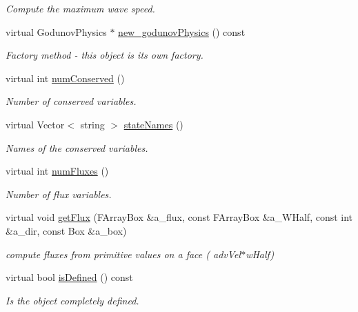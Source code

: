\begin{DoxyCompactItemize}
\begin{DoxyCompactList}\small\item\em Compute the maximum wave speed. \end{DoxyCompactList}\item 
virtual Godunov\-Physics $\ast$ \hyperlink{class_advection_physics_abbf17dd7a6726453af2e94d9ce1b5686}{new\-\_\-godunov\-Physics} () const 
\begin{DoxyCompactList}\small\item\em Factory method -\/ this object is its own factory. \end{DoxyCompactList}\item 
virtual int \hyperlink{class_advection_physics_ab139a3b1201a76e97e918381c5b3ff98}{num\-Conserved} ()
\begin{DoxyCompactList}\small\item\em Number of conserved variables. \end{DoxyCompactList}\item 
virtual Vector$<$ string $>$ \hyperlink{class_advection_physics_a992f0d9ca9515de44b82981c14a2fb31}{state\-Names} ()
\begin{DoxyCompactList}\small\item\em Names of the conserved variables. \end{DoxyCompactList}\item 
virtual int \hyperlink{class_advection_physics_ab59b268a446dbe2912e000c11870ab2f}{num\-Fluxes} ()
\begin{DoxyCompactList}\small\item\em Number of flux variables. \end{DoxyCompactList}\item 
virtual void \hyperlink{class_advection_physics_a469e6262703804372173e378c37b735f}{get\-Flux} (F\-Array\-Box \&a\-\_\-flux, const F\-Array\-Box \&a\-\_\-\-W\-Half, const int \&a\-\_\-dir, const Box \&a\-\_\-box)
\begin{DoxyCompactList}\small\item\em compute fluxes from primitive values on a face ( adv\-Vel$\ast$w\-Half) \end{DoxyCompactList}\item 
virtual bool \hyperlink{class_advection_physics_ac35ee4f5f59fd7c9af605b47af635f8e}{is\-Defined} () const 
\begin{DoxyCompactList}\small\item\em Is the object completely defined. \end{DoxyCompactList}\item 

\end{DoxyCompactItemize}
